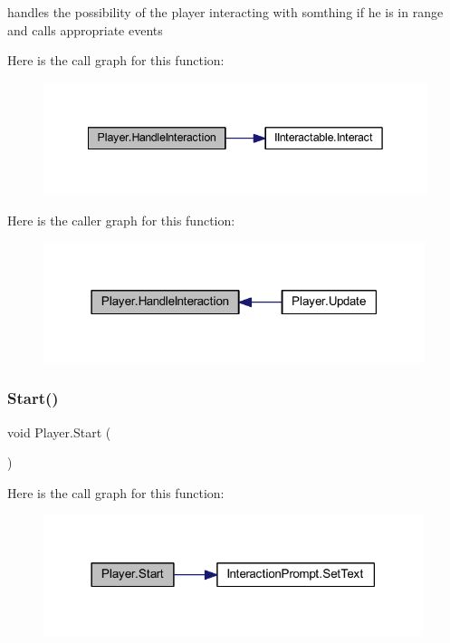 handles the possibility of the player interacting with somthing if he is in range and calls appropriate events 

Here is the call graph for this function\+:
\nopagebreak
\begin{figure}[H]
\begin{center}
\leavevmode
\includegraphics[width=342pt]{class_player_a377a703ca99ceaf80d62874b2585c745_cgraph}
\end{center}
\end{figure}
Here is the caller graph for this function\+:
\nopagebreak
\begin{figure}[H]
\begin{center}
\leavevmode
\includegraphics[width=316pt]{class_player_a377a703ca99ceaf80d62874b2585c745_icgraph}
\end{center}
\end{figure}
\mbox{\label{class_player_a1a09a3ded16ac1646f6bdd4f25fe0ddd}} 
\subsubsection{\texorpdfstring{Start()}{Start()}}
{\footnotesize\ttfamily void Player.\+Start (\begin{DoxyParamCaption}{ }\end{DoxyParamCaption})\hspace{0.3cm}{\ttfamily [private]}}

Here is the call graph for this function\+:
\nopagebreak
\begin{figure}[H]
\begin{center}
\leavevmode
\includegraphics[width=314pt]{class_player_a1a09a3ded16ac1646f6bdd4f25fe0ddd_cgraph}
\end{center}
\end{figure}
\mbox{\label{class_player_aace80372e18e32fe177e295fe5d93ba8}} 
